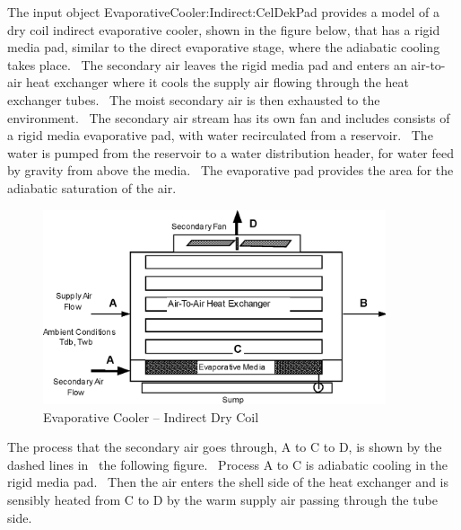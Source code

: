 The input object EvaporativeCooler:Indirect:CelDekPad provides a model of a dry coil indirect evaporative cooler, shown in the figure below, that has a rigid media pad, similar to the direct evaporative stage, where the adiabatic cooling takes place.~ The secondary air leaves the rigid media pad and enters an air-to-air heat exchanger where it cools the supply air flowing through the heat exchanger tubes.~ The moist secondary air is then exhausted to the environment.~ The secondary air stream has its own fan and includes consists of a rigid media evaporative pad, with water recirculated from a reservoir.~ The water is pumped from the reservoir to a water distribution header, for water feed by gravity from above the media.~ The evaporative pad provides the area for the adiabatic saturation of the air.

\begin{figure}[hbtp] %
\centering
\includegraphics[width=0.9\textwidth, height=0.9\textheight, keepaspectratio=true]{media/image4794.png}
\caption{Evaporative Cooler -- Indirect Dry Coil \protect \label{fig:evaporative-cooler-indirect-dry-coil}}
\end{figure}

The process that the secondary air goes through, A to C to D, is shown by the dashed lines in~ the following figure.~ Process A to C is adiabatic cooling in the rigid media pad.~ Then the air enters the shell side of the heat exchanger and is sensibly heated from C to D by the warm supply air passing through the tube side.

